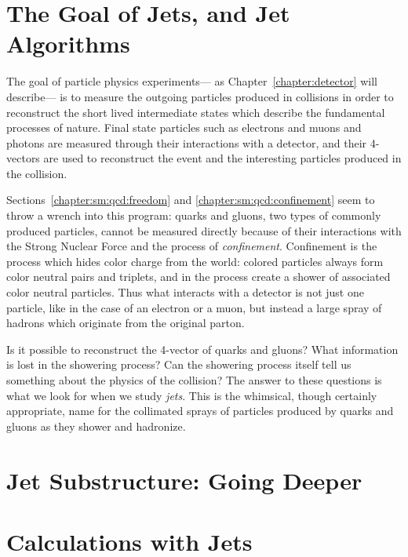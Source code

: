 \label{chapter:jets-and-substructure}
\section{The Goal of Jets, and Jet Algorithms}

The goal of particle physics experiments--- as Chapter~\ref{chapter:detector} will describe--- is to measure the outgoing particles produced in collisions in order to reconstruct the short lived intermediate states which describe the fundamental processes of nature. Final state particles such as electrons and muons and photons are measured through their interactions with a detector, and their 4-vectors are used to reconstruct the event and the interesting particles produced in the collision. 

Sections~\ref{chapter:sm:qcd:freedom} and \ref{chapter:sm:qcd:confinement} seem to throw a wrench into this program: quarks and gluons, two types of commonly produced particles, cannot be measured directly because of their interactions with the Strong Nuclear Force and the process of \textit{confinement}. Confinement is the process which hides color charge from the world: colored particles always form color neutral pairs and triplets, and in the process create a shower of associated color neutral particles. Thus what interacts with a detector is not just one particle, like in the case of an electron or a muon, but instead a large spray of hadrons which originate from the original parton.

Is it possible to reconstruct the 4-vector of quarks and gluons? What information is lost in the showering process? Can the showering process itself tell us something about the physics of the collision? The answer to these questions is what we look for when we study \textit{jets}. This is the whimsical, though certainly appropriate, name for the collimated sprays of particles produced by quarks and gluons as they shower and hadronize. 

\section{Jet Substructure: Going Deeper}
\section{Calculations with Jets}
